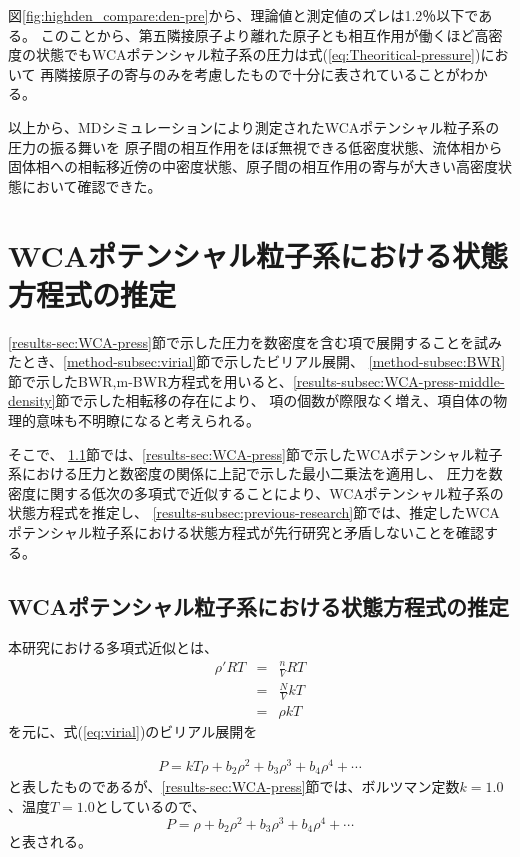 \documentclass[titlepage]{jsreport}
\begin{document}
{{{図\ref{fig:highden_compare:den-pre}から、理論値と測定値のズレは1.2％以下である。
このことから、第五隣接原子より離れた原子とも相互作用が働くほど高密度の状態でもWCAポテンシャル粒子系の圧力は式(\ref{eq:Theoritical-pressure})において
再隣接原子の寄与のみを考慮したもので十分に表されていることがわかる。

以上から、MDシミュレーションにより測定されたWCAポテンシャル粒子系の圧力の振る舞いを
原子間の相互作用をほぼ無視できる低密度状態、流体相から固体相への相転移近傍の中密度状態、原子間の相互作用の寄与が大きい高密度状態において確認できた。

\newpage
\section{WCAポテンシャル粒子系における状態方程式の推定}\label{results-sec:WCA-equation}
\ref{results-sec:WCA-press}節で示した圧力を数密度を含む項で展開することを試みたとき、\ref{method-subsec:virial}節で示したビリアル展開、
\ref{method-subsec:BWR}節で示したBWR,m-BWR方程式を用いると、\ref{results-subsec:WCA-press-middle-density}節で示した相転移の存在により、
項の個数が際限なく増え、項自体の物理的意味も不明瞭になると考えられる。

そこで、
\ref{results-subsec:WCA-equation}節では、\ref{results-sec:WCA-press}節で示したWCAポテンシャル粒子系における圧力と数密度の関係に上記で示した最小二乗法を適用し、
圧力を数密度に関する低次の多項式で近似することにより、WCAポテンシャル粒子系の状態方程式を推定し、
\ref{results-subsec:previous-research}節では、推定したWCAポテンシャル粒子系における状態方程式が先行研究と矛盾しないことを確認する。


\subsection{WCAポテンシャル粒子系における状態方程式の推定}\label{results-subsec:WCA-equation}
本研究における多項式近似とは、
\large
\begin{eqnarray}
    {{\rho}'}RT \nonumber &=& \frac{n}{V}RT \nonumber \\ 
    &=& \frac{N}{V}kT \nonumber \\ 
    &=& {\rho}kT \nonumber
\end{eqnarray}
\normalsize
を元に、式(\ref{eq:virial})のビリアル展開を

\large
\begin{eqnarray}
    P=kT\rho+b_2\rho^2+b_3\rho^3+b_4\rho^4+\cdots\label{eq:search-virial} \nonumber
\end{eqnarray}
\normalsize
と表したものであるが、\ref{results-sec:WCA-press}節では、ボルツマン定数$k=1.0$、温度$T=1.0$としているので、
\large
\begin{equation}
    P=\rho+b_2\rho^2+b_3\rho^3+b_4\rho^4+\cdots\label{eq:modified-search-virial}
\end{equation}
\normalsize
と表される。

}}}
\end{document}
